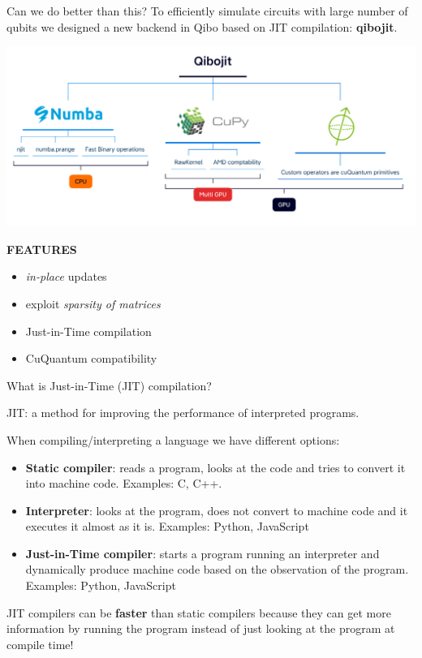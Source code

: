 \documentclass[11p,aspectratio=169]{beamer}
\begin{document}
\begin{frame}{Can we do better than this?}
    To efficiently simulate circuits with large number of qubits we designed
    a new backend in Qibo based on JIT compilation: \textbf{qibojit}.


    \includegraphics[width= \textwidth]{figures/Qibojit.png}
    
    \textbf{FEATURES}
    \begin{multicols*}{2}
        \begin{itemize}
            \item \emph{in-place} updates 
            \item exploit \emph{sparsity of matrices}
            \item Just-in-Time compilation
            \item CuQuantum compatibility
        \end{itemize}
    \end{multicols*}

\end{frame}

\begin{frame}{What is Just-in-Time (JIT) compilation?}

    JIT: a method for improving the performance of interpreted programs.

    When compiling/interpreting a language we have different options:

    \begin{itemize}
        \item \textbf{Static compiler}: reads a program, looks at the code and tries 
        to convert it into machine code. Examples: C, C++.

         \item \textbf{Interpreter}: looks at the program, does not convert to machine
    code and it executes it almost as it is. Examples: Python, JavaScript

        \item \textbf{Just-in-Time compiler}: starts a program running an interpreter
    and dynamically produce machine code based on the observation of the program.
    Examples: Python, JavaScript
    \end{itemize}
    

    JIT compilers can be \textbf{faster} than static compilers because they can get
    more information by running the program instead of just looking at the
    program at compile time! 


    
\end{frame}
\end{document}
